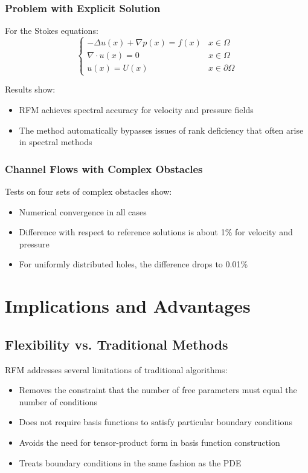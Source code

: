 \documentclass[11pt]{article}
\begin{document}
\subsubsection{Problem with Explicit Solution}
For the Stokes equations:
\begin{equation}
\begin{cases}
-\Delta u(x) + \nabla p(x) = f(x) & x \in \Omega \\
\nabla \cdot u(x) = 0 & x \in \Omega \\
u(x) = U(x) & x \in \partial\Omega
\end{cases}
\end{equation}

Results show:
\begin{itemize}
    \item RFM achieves spectral accuracy for velocity and pressure fields
    \item The method automatically bypasses issues of rank deficiency that often arise in spectral methods
\end{itemize}

\subsubsection{Channel Flows with Complex Obstacles}
Tests on four sets of complex obstacles show:
\begin{itemize}
    \item Numerical convergence in all cases
    \item Difference with respect to reference solutions is about 1\% for velocity and pressure
    \item For uniformly distributed holes, the difference drops to 0.01\%
\end{itemize}

\section{Implications and Advantages}

\subsection{Flexibility vs. Traditional Methods}
RFM addresses several limitations of traditional algorithms:
\begin{itemize}
    \item Removes the constraint that the number of free parameters must equal the number of conditions
    \item Does not require basis functions to satisfy particular boundary conditions
    \item Avoids the need for tensor-product form in basis function construction
    \item Treats boundary conditions in the same fashion as the PDE
\end{itemize}
\end{document}
